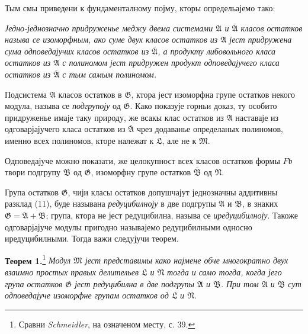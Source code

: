 ﻿\documentclass[11pt]{article}
\providecommand{\mM}{\mathfrak M}
\providecommand{\mN}{\mathfrak N}
\providecommand{\mL}{\mathfrak L}
\providecommand{\mG}{\mathfrak G}
\providecommand{\mA}{\mathfrak A}
\providecommand{\mB}{\mathfrak B}
\providecommand{\mbarA}{\bar{\mathfrak A}}
\providecommand{\mbarB}{\bar{\mathfrak B}}
\providecommand{\mb}{\mathfrak b}
\begin{document}
Тым смы приведени к фундаменталному појму, кторы определьајемо тако:

\textit{Једно-једнозначно придруженье меджу двема системами \(\mA\) и \(\mbarA\) класов остатков называ се изоморфным, ако суме двух класов остатков из \(\mA\) јест придружена сума одповедајучих класов остатков из \(\mbarA\), а продукту либовольного класа остатков из \(\mA\) с полиномом јест придружен продукт одповедајучего класа остатков из \(\mbarA\) с тым самым полиномом.}

Подсистема \(\mA\) класов остатков в \(\mG\), ктора јест изоморфна групе остатков некого модула, называ се \textit{подгрупоју} од \(\mG\). Како показује горньи доказ, ту особито придруженье имаје таку природу, же всакы клас остатков из \(\mA\) наставаје из одговарјајучего класа остатков из \(\mbarA\) чрез додаванье определаных полиномов, именно всех полиномов, кторе належат к \(\mL\), але не к \(\mM\).

Одповедајуче можно показати, же целокупност всех класов остатков формы \(F\mb\) твори подгрупу \(\mB\) од \(\mG\), изоморфну групе остатков \(\mbarB\) од \(\mN\).

Група остатков \(\mG\), чији класы остатков допушчајут једнозначны аддитивны разклад (11), буде называна \textit{редуцибилноју} в две подгрупы \(\mA\) и \(\mB\), в знаких \(\mG=\mA+\mB\); група, ктора не јест редуцибилна, называ се \textit{иредуцибилноју}. Такоже одговарјајуче модулы пригодно называјемо редуцибилными односно иредуцибилными. Тогда важи следујучи теорем.

\textbf{Теорем 1.}\footnote{Сравни \emph{Schmeidler}, на означеном месту, с. 39.} \textit{Модул \(\mM\) јест представимы како најмене обче многократно двух взаимно простых правых делительев \(\mL\) и \(\mN\) тогда и само тогда, когда јего група остатков \(\mG\) јест редуцибилна в две подгрупы \(\mA\) и \(\mB\). При том \(\mA\) и \(\mB\) сут одповедајуче изоморфне групам остатков од \(\mL\) и \(\mN\).}
\end{document}
